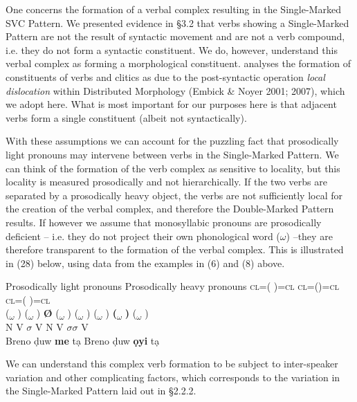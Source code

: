\documentclass[output=paper]{langsci/langscibook}
\begin{document}
One concerns the formation of a verbal complex resulting in the Single-Marked SVC Pattern. We presented evidence in §3.2 that verbs showing a Single-Marked Pattern are not the result of syntactic movement and are not a verb compound, i.e. they do not form a syntactic constituent. We do, however, understand this verbal complex as forming a morphological constituent. \citet{Rolle2015} analyses the formation of constituents of verbs and clitics as due to the post-syntactic operation \textit{local dislocation }within Distributed Morphology (Embick \& Noyer 2001; 2007), which we adopt here. What is most important for our purposes here is that adjacent verbs form a single constituent (albeit not syntactically). 

With these assumptions we can account for the puzzling fact that prosodically light pronouns may intervene between verbs in the Single-Marked Pattern. We can think of the formation of the verb complex as sensitive to locality, but this locality is measured prosodically and not hierarchically. If the two verbs are separated by a prosodically heavy object, the verbs are not sufficiently local for the creation of the verbal complex, and therefore the Double-Marked Pattern results. If however we assume that monosyllabic pronouns are prosodically deficient – i.e. they do not project their own phonological word ($\omega $) –they are therefore transparent to the formation of the verbal complex. This is illustrated in (28) below, using data from the examples in (6) and (8) above. 

\ea
{Prosodically light pronouns         Prosodically heavy pronouns}
          \textsc{cl}=(        )=\textsc{cl}         \textsc{cl}=()=\textsc{cl   cl}=(  )=\textsc{cl}\\
     (\textsubscript{$\omega $}     )    (\textsubscript{$\omega $}   )  \textbf{Ø}   (\textsubscript{$\omega $}  )       (\textsubscript{$\omega $}    )        (\textsubscript{$\omega $}  )   \textbf{(}\textbf{\textsubscript{$\omega $}}  \textbf{)}  (\textsubscript{$\omega $}  )\\
     N      V    \textbf{$\sigma $}   V         N      V    \textbf{$\sigma \sigma $}    V\\
    Breno    ḍuw  \textbf{me}   tạ         Breno    ḍuw    \textbf{ọyi}    tạ\\
\z

We can understand this complex verb formation to be subject to inter-speaker variation and other complicating factors, which corresponds to the variation in the Single-Marked Pattern laid out in §2.2.2.
\end{document}
